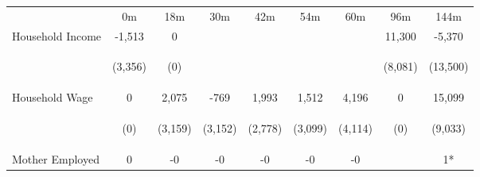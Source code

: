 \begin{tabular}{lcccccccc}
\hline \noalign{\smallskip} & 0m & 18m & 30m & 42m & 54m & 60m & 96m & 144m\\
\noalign{\smallskip}\hline \noalign{\smallskip}Household Income & -1,513 & 0 &  &  &  &  & 11,300 & -5,370\\
 & \begin{footnotesize}(3,356)\end{footnotesize} & \begin{footnotesize}(0)\end{footnotesize} & \begin{footnotesize}\end{footnotesize} & \begin{footnotesize}\end{footnotesize} & \begin{footnotesize}\end{footnotesize} & \begin{footnotesize}\end{footnotesize} & \begin{footnotesize}(8,081)\end{footnotesize} & \begin{footnotesize}(13,500)\end{footnotesize}\\
\noalign{\smallskip}Household Wage & 0 & 2,075 & -769 & 1,993 & 1,512 & 4,196 & 0 & 15,099\\
 & \begin{footnotesize}(0)\end{footnotesize} & \begin{footnotesize}(3,159)\end{footnotesize} & \begin{footnotesize}(3,152)\end{footnotesize} & \begin{footnotesize}(2,778)\end{footnotesize} & \begin{footnotesize}(3,099)\end{footnotesize} & \begin{footnotesize}(4,114)\end{footnotesize} & \begin{footnotesize}(0)\end{footnotesize} & \begin{footnotesize}(9,033)\end{footnotesize}\\
\noalign{\smallskip}Mother Employed & 0 & -0 & -0 & -0 & -0 & -0 &  & 1*\\

\end{tabular}
